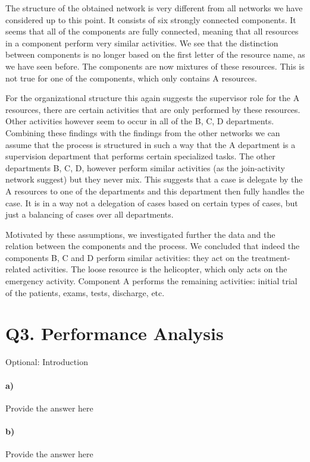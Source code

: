 \documentclass[12pt]{report}
\begin{document}
The structure of the obtained network is very different from all networks we have considered up to this point. It consists of six strongly connected components. It seems that all of the components are fully connected, meaning that all resources in a component perform very similar activities. We see that the distinction between components is no longer based on the first letter of the resource name, as we have seen before. The components are now mixtures of these resources. This is not true for one of the components, which only contains A resources.

For the organizational structure this again suggests the supervisor role for the A resources, there are certain activities that are only performed by these resources. Other activities however seem to occur in all of the B, C, D departments. Combining these findings with the findings from the other networks we can assume that the process is structured in such a way that the A department is a supervision department that performs certain specialized tasks. The other departments B, C, D, however perform similar activities (as the join-activity network suggest) but they never mix. This suggests that a case is delegate by the A resources to one of the departments and this department then fully handles the case. It is in a way not a delegation of cases based on certain types of cases, but just a balancing of cases over all departments.

Motivated by these assumptions, we investigated further the data and the relation between the components and the process. We concluded that indeed the components B, C and D perform similar activities: they act on the treatment-related activities. The loose resource is the helicopter, which only acts on the emergency activity. Component A performs the remaining activities: initial trial of the patients, exams, tests, discharge, etc.

\section{Q3. Performance Analysis}
\textlangle Optional: Introduction \textrangle
\paragraph{a)} \textlangle Provide the answer here\textrangle
\paragraph{b)} \textlangle Provide the answer here\textrangle
\end{document}
